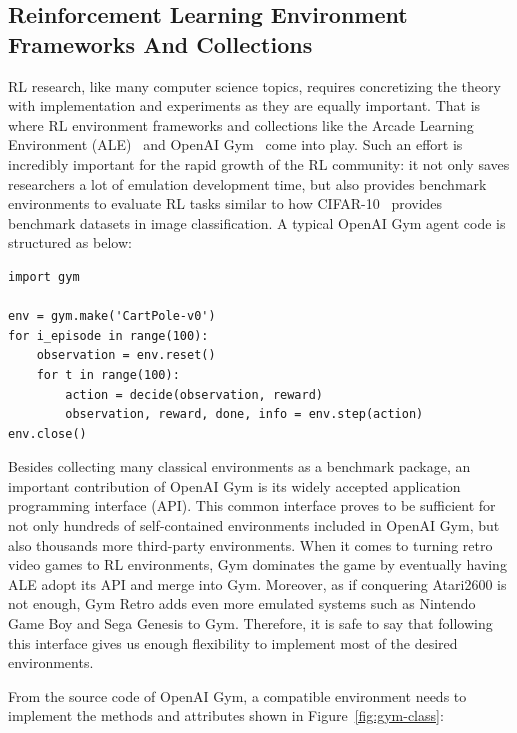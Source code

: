 \subsection{Reinforcement Learning Environment Frameworks And Collections}
RL research, like many computer science topics, requires concretizing the theory with implementation and experiments as they are equally important. That is where RL environment frameworks and collections like the Arcade Learning Environment (ALE)~\cite{ale} and OpenAI Gym~\cite{openai-gym} come into play. Such an effort is incredibly important for the rapid growth of the RL community: it not only saves researchers a lot of emulation development time, but also provides benchmark environments to evaluate RL tasks similar to how CIFAR-10~\cite{cifar-10} provides benchmark datasets in image classification. A typical OpenAI Gym agent code is structured as below:

\begin{code}
\begin{verbatim}
import gym

env = gym.make('CartPole-v0')
for i_episode in range(100):
    observation = env.reset()
    for t in range(100):
        action = decide(observation, reward)
        observation, reward, done, info = env.step(action)
env.close()
\end{verbatim}
\label{code:gym-agent}
\end{code}

Besides collecting many classical environments as a benchmark package, an important contribution of OpenAI Gym is its widely accepted application programming interface (API). This common interface proves to be sufficient for not only hundreds of self-contained environments included in OpenAI Gym, but also thousands more third-party environments. When it comes to turning retro video games to RL environments, Gym dominates the game by eventually having ALE adopt its API and merge into Gym. Moreover, as if conquering Atari2600 is not enough, Gym Retro \cite{gym-retro} adds even more emulated systems such as Nintendo Game Boy and Sega Genesis to Gym. Therefore, it is safe to say that following this interface gives us enough flexibility to implement most of the desired environments.

From the source code of OpenAI Gym, a compatible environment needs to implement the methods and attributes shown in Figure~\ref{fig:gym-class}:

